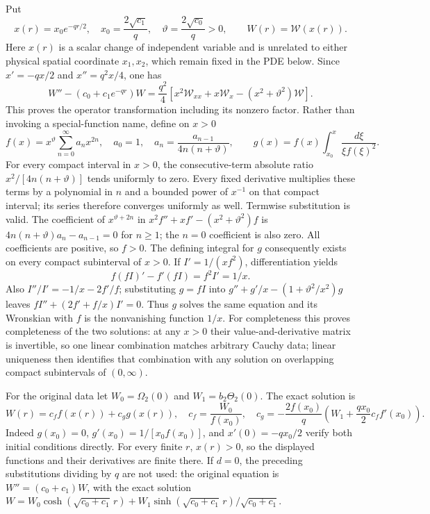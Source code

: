 Put
\[
 x(r)=x_0e^{-qr/2},\quad x_0=\frac{2\sqrt{c_1}}q,\quad
 \vartheta=\frac{2\sqrt{c_0}}q>0,\qquad W(r)=\mathcal W(x(r)).
\]
Here $x(r)$ is a scalar change of independent variable and is unrelated
to either physical spatial coordinate $x_1,x_2$, which remain fixed
in the PDE below. Since $x'=-qx/2$ and $x''=q^2x/4$, one has
\[
 W''-(c_0+c_1e^{-qr})W
 =\frac{q^2}4\left[x^2\mathcal W_{xx}+x\mathcal W_x
                         -(x^2+\vartheta^2)\mathcal W\right].
\]
This proves the operator transformation including its nonzero factor.
Rather than invoking a special-function name, define on $x>0$
\begin{equation}
 f(x)=x^{\vartheta}\sum_{n=0}^\infty a_nx^{2n},\quad
 a_0=1,\quad a_n=\frac{a_{n-1}}{4n(n+\vartheta)},\qquad
 g(x)=f(x)\int_{x_0}^x\frac{d\xi}{\xi f(\xi)^2}.
 \label{eq:cv-feedback-fundamental}
\end{equation}
For every compact interval in $x>0$, the consecutive-term absolute
ratio $x^2/[4n(n+\vartheta)]$ tends uniformly to zero.
Every fixed derivative multiplies these terms by a polynomial in $n$
and a bounded power of $x^{-1}$ on that compact interval; its series
therefore converges uniformly as well. Termwise substitution is valid.
The coefficient of $x^{\vartheta+2n}$ in
$x^2f''+xf'-(x^2+\vartheta^2)f$ is
$4n(n+\vartheta)a_n-a_{n-1}=0$ for $n\geq1$; the $n=0$
coefficient is also zero. All coefficients are positive, so $f>0$.
The defining integral for $g$ consequently exists on every compact
subinterval of $x>0$. If $I'=1/(xf^2)$, differentiation yields
\[
 f(fI)' - f'(fI)=f^2I'=1/x.
\]
Also $I''/I'=-1/x-2f'/f$; substituting $g=fI$ into
$g''+g'/x-(1+\vartheta^2/x^2)g$ leaves
$fI''+(2f'+f/x)I'=0$. Thus $g$ solves the same equation and its
Wronskian with $f$ is the nonvanishing function $1/x$.
For completeness this proves completeness of the two solutions:
at any $x>0$ their value-and-derivative matrix is invertible, so one
linear combination matches arbitrary Cauchy data; linear uniqueness
then identifies that combination with any solution on overlapping
compact subintervals of $(0,\infty)$.

For the original data let $W_0=\Omega_2(0)$ and
$W_1=b_2\Theta_2(0)$. The exact solution is
\begin{equation}
 W(r)=c_ff(x(r))+c_gg(x(r)),\quad
 c_f=\frac{W_0}{f(x_0)},\quad
 c_g=-\frac{2f(x_0)}q\left(W_1+\frac{qx_0}{2}c_ff'(x_0)\right).
 \label{eq:cv-feedback-initial-map}
\end{equation}
Indeed $g(x_0)=0$, $g'(x_0)=1/[x_0f(x_0)]$, and
$x'(0)=-qx_0/2$ verify both initial conditions directly.
For every finite $r$, $x(r)>0$, so the displayed functions and their
derivatives are finite there. If $d=0$, the preceding substitutions
dividing by $q$ are not used: the original equation is
$W''=(c_0+c_1)W$, with the exact solution
$W=W_0\cosh(\sqrt{c_0+c_1}\,r)
+W_1\sinh(\sqrt{c_0+c_1}\,r)/\sqrt{c_0+c_1}$.

